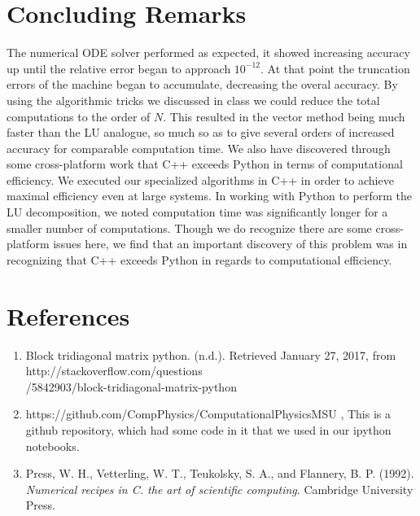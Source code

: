 \documentclass{article}
\begin{document}
\section{Concluding Remarks}
The numerical ODE solver performed as expected, it showed increasing accuracy up until the relative error began to approach $10^{-12}$. At that point the truncation errors of the machine began to accumulate, decreasing the overal accuracy. 
By using the algorithmic tricks we discussed in class we could reduce the total computations to the order of $N$. This resulted in the vector method being much faster than the LU analogue, so much so as to give several orders of increased accuracy for comparable computation time.  We also have discovered through some cross-platform work that C++ exceeds Python in terms of computational efficiency. We executed our specialized algorithms in C++ in order to achieve maximal efficiency even at large systems. In working with Python to perform the LU decomposition, we noted computation time was significantly longer for a smaller number of computations. Though we do recognize there are some cross-platform issues here, we find that an important discovery of this problem was in recognizing that C++ exceeds Python in regards to computational efficiency.

\section{References}
\begin{enumerate}
	\item  Block tridiagonal matrix python. (n.d.). Retrieved January 27, 2017, from http://stackoverflow.com/questions\\/5842903/block-tridiagonal-matrix-python
	
	\item https://github.com/CompPhysics/ComputationalPhysicsMSU , This is a github repository, which had some code in it that we used in our ipython notebooks.
	
	
	
	\item Press, W. H., Vetterling, W. T., Teukolsky, S. A., and Flannery, B. P. (1992). \textit{Numerical recipes in C. the art of scientific computing}. Cambridge University Press.
\end{enumerate}
\end{document}
